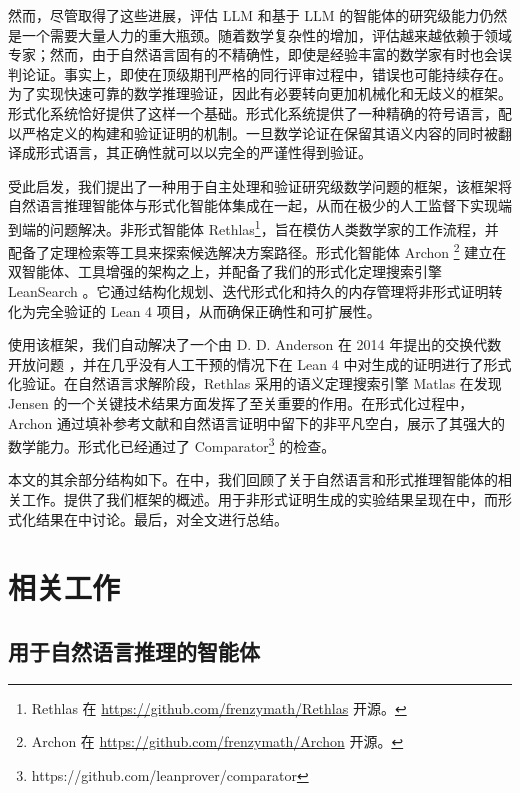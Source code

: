 ﻿\documentclass[]{pkuai4m}
\theoremstyle{plain}
\theoremstyle{definition}
\begin{document}
然而，尽管取得了这些进展，评估 LLM 和基于 LLM 的智能体的研究级能力仍然是一个需要大量人力的重大瓶颈。随着数学复杂性的增加，评估越来越依赖于领域专家；然而，由于自然语言固有的不精确性，即使是经验丰富的数学家有时也会误判论证。事实上，即使在顶级期刊严格的同行评审过程中，错误也可能持续存在。为了实现快速可靠的数学推理验证，因此有必要转向更加机械化和无歧义的框架。形式化系统恰好提供了这样一个基础。形式化系统提供了一种精确的符号语言，配以严格定义的构建和验证证明的机制。一旦数学论证在保留其语义内容的同时被翻译成形式语言，其正确性就可以以完全的严谨性得到验证。

受此启发，我们提出了一种用于自主处理和验证研究级数学问题的框架，该框架将自然语言推理智能体与形式化智能体集成在一起，从而在极少的人工监督下实现端到端的问题解决。非形式智能体 Rethlas\footnote{Rethlas 在 \href{https://github.com/frenzymath/Rethlas}{https://github.com/frenzymath/Rethlas} 开源。}，旨在模仿人类数学家的工作流程，并配备了定理检索等工具来探索候选解决方案路径。形式化智能体 Archon \footnote{Archon 在 \href{https://github.com/frenzymath/Archon}{https://github.com/frenzymath/Archon} 开源。} 建立在双智能体、工具增强的架构之上，并配备了我们的形式化定理搜索引擎 LeanSearch \cite{gao2024semantic}。它通过结构化规划、迭代形式化和持久的内存管理将非形式证明转化为完全验证的 Lean 4 项目，从而确保正确性和可扩展性。

使用该框架，我们自动解决了一个由 D. D. Anderson 在 2014 年提出的交换代数开放问题 \cite{cahen2014open}，并在几乎没有人工干预的情况下在 Lean 4 中对生成的证明进行了形式化验证。在自然语言求解阶段，Rethlas 采用的语义定理搜索引擎 Matlas 在发现 Jensen \cite{jensen2006completions} 的一个关键技术结果方面发挥了至关重要的作用。在形式化过程中，Archon 通过填补参考文献和自然语言证明中留下的非平凡空白，展示了其强大的数学能力。形式化已经通过了 Comparator\footnote{https://github.com/leanprover/comparator} 的检查。

本文的其余部分结构如下。在中，我们回顾了关于自然语言和形式推理智能体的相关工作。提供了我们框架的概述。用于非形式证明生成的实验结果呈现在中，而形式化结果在中讨论。最后，对全文进行总结。

\section{相关工作}\label{sec:related}
\subsection{用于自然语言推理的智能体}
\end{document}

